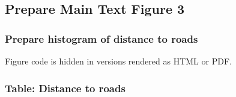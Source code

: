 \documentclass[
]{article}
\newenvironment{Shaded}{}{}
\newcommand{\CommentTok}[1]{\textcolor[rgb]{0.00,0.50,0.00}{#1}}
\newcommand{\DataTypeTok}[1]{#1}
\newcommand{\DecValTok}[1]{#1}
\newcommand{\KeywordTok}[1]{\textcolor[rgb]{0.00,0.00,1.00}{#1}}
\newcommand{\NormalTok}[1]{#1}
\newcommand{\OperatorTok}[1]{#1}
\newcommand{\StringTok}[1]{\textcolor[rgb]{0.00,0.50,0.50}{#1}}
\begin{document}
\begin{Shaded}
\end{Shaded}

\hypertarget{prepare-main-text-figure-3}{%
\subsection{Prepare Main Text Figure 3}\label{prepare-main-text-figure-3}}

\hypertarget{prepare-histogram-of-distance-to-roads}{%
\subsubsection{Prepare histogram of distance to roads}\label{prepare-histogram-of-distance-to-roads}}

Figure code is hidden in versions rendered as HTML or PDF.

\hypertarget{table-distance-to-roads}{%
\subsubsection{Table: Distance to roads}\label{table-distance-to-roads}}
\end{document}
